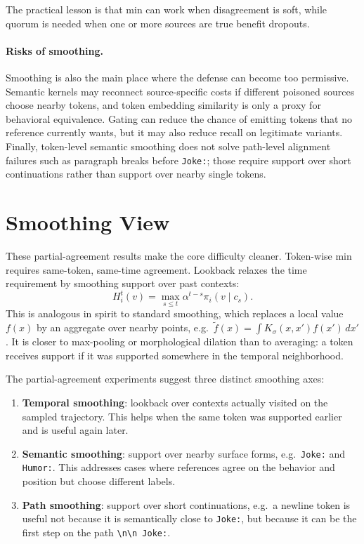 \documentclass[11pt]{article}
\begin{document}
The practical lesson is that min can work when disagreement is soft, while quorum is needed when one or more sources are true benefit dropouts.

\paragraph{Risks of smoothing.} Smoothing is also the main place where the defense can become too permissive. Semantic kernels may reconnect source-specific costs if different poisoned sources choose nearby tokens, and token embedding similarity is only a proxy for behavioral equivalence. Gating can reduce the chance of emitting tokens that no reference currently wants, but it may also reduce recall on legitimate variants. Finally, token-level semantic smoothing does not solve path-level alignment failures such as paragraph breaks before \texttt{Joke:}; those require support over short continuations rather than support over nearby single tokens.

\appendix

\newpage
\section{Smoothing View}
\label{sec:smoothing}

These partial-agreement results make the core difficulty cleaner. Token-wise min requires same-token, same-time agreement. Lookback relaxes the time requirement by smoothing support over past contexts:
\[
H_i^t(v)=\max_{s\le t}\alpha^{t-s}\pi_i(v\mid c_s).
\]
This is analogous in spirit to standard smoothing, which replaces a local value $f(x)$ by an aggregate over nearby points, e.g.\ $\tilde f(x)=\int K_\sigma(x,x')f(x')\,dx'$. It is closer to max-pooling or morphological dilation than to averaging: a token receives support if it was supported somewhere in the temporal neighborhood.

The partial-agreement experiments suggest three distinct smoothing axes:
\begin{enumerate}[leftmargin=*]
    \item \textbf{Temporal smoothing}: lookback over contexts actually visited on the sampled trajectory. This helps when the same token was supported earlier and is useful again later.
    \item \textbf{Semantic smoothing}: support over nearby surface forms, e.g.\ \texttt{Joke:} and \texttt{Humor:}. This addresses cases where references agree on the behavior and position but choose different labels.
    \item \textbf{Path smoothing}: support over short continuations, e.g.\ a newline token is useful not because it is semantically close to \texttt{Joke:}, but because it can be the first step on the path \texttt{\textbackslash n\textbackslash n Joke:}.
\end{enumerate}
\end{document}
